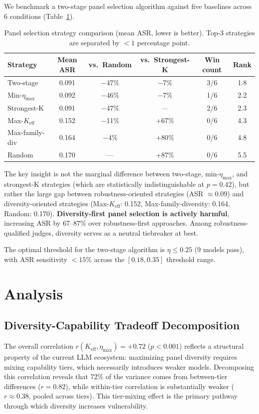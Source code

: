 \documentclass[11pt,a4paper]{article}
\newcommand{\keff}{K_{\text{eff}}}
\newcommand{\etamax}{\eta_{\max}}
\begin{document}
We benchmark a two-stage panel selection algorithm against five baselines across 6 conditions (Table~\ref{tab:panel_selection}).

\begin{table}[t]
\centering
\caption{Panel selection strategy comparison (mean ASR, lower is better). Top-3 strategies are separated by $<1$ percentage point.}
\label{tab:panel_selection}
\small
\begin{tabular}{@{}lccccc@{}}
\toprule
Strategy & Mean ASR & vs.\ Random & vs.\ Strongest-K & Win count & Rank \\
\midrule
Two-stage & 0.091 & $-$47\% & $-$7\% & 3/6 & 1.8 \\
Min-$\etamax$ & 0.092 & $-$46\% & $-$7\% & 1/6 & 2.2 \\
Strongest-K & 0.091 & $-$47\% & --- & 2/6 & 2.3 \\
Max-$\keff$ & 0.152 & $-$11\% & +67\% & 0/6 & 4.3 \\
Max-family-div & 0.164 & $-$4\% & +80\% & 0/6 & 4.8 \\
Random & 0.170 & --- & +87\% & 0/6 & 5.5 \\
\bottomrule
\end{tabular}
\end{table}

The key insight is not the marginal difference between two-stage, min-$\etamax$, and strongest-K strategies (which are statistically indistinguishable at $p = 0.42$), but rather the large gap between robustness-oriented strategies (ASR $\approx 0.09$) and diversity-oriented strategies (Max-$\keff$: 0.152, Max-family-diversity: 0.164, Random: 0.170). \textbf{Diversity-first panel selection is actively harmful}, increasing ASR by 67--87\% over robustness-first approaches. Among robustness-qualified judges, diversity serves as a neutral tiebreaker at best.

The optimal threshold for the two-stage algorithm is $\eta \leq 0.25$ (9 models pass), with ASR sensitivity $<15\%$ across the $[0.18, 0.35]$ threshold range.

\section{Analysis}

\subsection{Diversity-Capability Tradeoff Decomposition}

The overall correlation $r(\keff, \etamax) = +0.72$ ($p < 0.001$) reflects a structural property of the current LLM ecosystem: maximizing panel diversity requires mixing capability tiers, which necessarily introduces weaker models. Decomposing this correlation reveals that 72\% of the variance comes from between-tier differences ($r = 0.82$), while within-tier correlation is substantially weaker ($r \approx 0.38$, pooled across tiers). This tier-mixing effect is the primary pathway through which diversity increases vulnerability.
\end{document}
